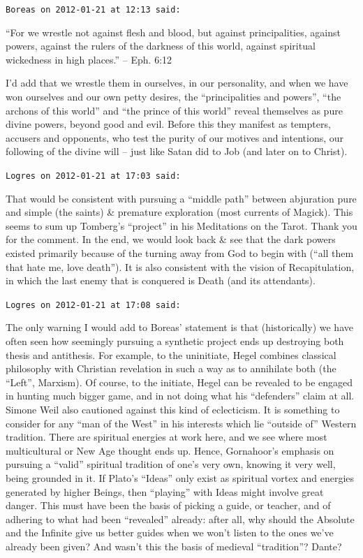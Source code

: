 \begin{footnotesize}
\begin{sffamily}
\texttt{Boreas on 2012-01-21 at 12:13 said:}

``For we wrestle not against flesh and blood, but against principalities, against powers, against the rulers of the darkness of this world, against spiritual wickedness in high places.'' -- Eph. 6:12

I'd add that we wrestle them in ourselves, in our personality, and when we have won ourselves and our own petty desires, the ``principalities and powers'', ``the archons of this world'' and ``the prince of this world'' reveal themselves as pure divine powers, beyond good and evil. Before this they manifest as tempters, accusers and opponents, who test the purity of our motives and intentions, our following of the divine will -- just like Satan did to Job (and later on to Christ).

\hfill

\texttt{Logres on 2012-01-21 at 17:03 said:}

That would be consistent with pursuing a ``middle path'' between abjuration pure and simple (the saints) \& premature exploration (most currents of Magick). This seems to sum up Tomberg's ``project'' in his Meditations on the Tarot. Thank you for the comment. In the end, we would look back \& see that the dark powers existed primarily because of the turning away from God to begin with (``all them that hate me, love death''). It is also consistent with the vision of Recapitulation, in which the last enemy that is conquered is Death (and its attendants).

\hfill

\texttt{Logres on 2012-01-21 at 17:08 said:}

The only warning I would add to Boreas' statement is that (historically) we have often seen how seemingly pursuing a synthetic project ends up destroying both thesis and antithesis. For example, to the uninitiate, Hegel combines classical philosophy with Christian revelation in such a way as to annihilate both (the ``Left'', Marxism). Of course, to the initiate, Hegel can be revealed to be engaged in hunting much bigger game, and in not doing what his ``defenders'' claim at all. Simone Weil also cautioned against this kind of eclecticism. It is something to consider for any ``man of the West'' in his interests which lie ``outside of'' Western tradition. There are spiritual energies at work here, and we see where most multicultural or New Age thought ends up. Hence, Gornahoor's emphasis on pursuing a ``valid'' spiritual tradition of one's very own, knowing it very well, being grounded in it. If Plato's ``Ideas'' only exist as spiritual vortex and energies generated by higher Beings, then ``playing'' with Ideas might involve great danger. This must have been the basis of picking a guide, or teacher, and of adhering to what had been ``revealed'' already: after all, why should the Absolute and the Infinite give us better guides when we won't listen to the ones we've already been given? And wasn't this the basis of medieval ``tradition''? Dante?


\end{sffamily}
\end{footnotesize}
